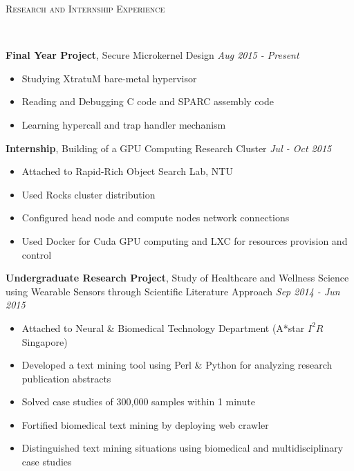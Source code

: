 \documentclass[a4paper, 12pt]{article}
\newenvironment{changemargin}[2]{%
  \begin{list}{}{%
      \setlength{\topsep}{0pt}%
      \setlength{\leftmargin}{#1}%
      \setlength{\rightmargin}{#2}%
      \setlength{\listparindent}{\parindent}%
      \setlength{\itemindent}{\parindent}%
      \setlength{\parsep}{\parskip}%
    }%
  \item[]}{\end{list}
}
\newcommand{\lineover}{
  \begin{changemargin}{-0.05in}{-0.05in}
    \vspace*{-8pt}
    \hrulefill \\
    \vspace*{-2pt}
  \end{changemargin}
}
\newcommand{\header}[1]{
  \begin{changemargin}{-0.6in}{-0.6in}
    \fontsize{15}{15}\scshape{#1}\\
    \lineover
    \vspace*{-4pt}
  \end{changemargin}
}
\newenvironment{body}
{
\vspace*{-16pt}
\begin{changemargin}{-0.25in}{-0.5in}
}
{
\end{changemargin}
}
\begin{document}
\smallskip
\header{Research and Internship Experience}
\begin{body}
  \vspace{14pt}
  \textbf{Final Year Project}, {Secure Microkernel Design} \hfill \emph{Aug 2015 - Present}\\
  \vspace*{-6pt}
  \begin{itemize} \itemsep -0pt  \small
  \item Studying XtratuM bare-metal hypervisor
  \item Reading and Debugging C code and SPARC assembly code
  \item Learning hypercall and trap handler mechanism
  \end{itemize}

  \textbf{Internship}, {Building of a GPU Computing Research Cluster} \hfill \emph{Jul - Oct 2015}\\
  \vspace*{-6pt}
  \begin{itemize} \itemsep -0pt  \small
  \item Attached to Rapid-Rich Object Search Lab, NTU
  \item Used Rocks cluster distribution
  \item Configured head node and compute nodes network connections
  \item Used Docker for Cuda GPU computing and LXC for resources provision and control
  \end{itemize}

  \textbf{Undergraduate Research Project}, {Study of Healthcare and Wellness Science using Wearable Sensors through Scientific Literature Approach} \hfill \emph{Sep 2014 - Jun 2015}\\
  \vspace*{-6pt}
  \begin{itemize} \itemsep -0pt  \small
  \item Attached to Neural \& Biomedical Technology Department (A*star $I^{2}R$ Singapore)
  \item Developed a text mining tool using Perl \& Python for analyzing research publication abstracts
  \item Solved case studies of 300,000 samples within 1 minute
  \item Fortified biomedical text mining by deploying web crawler
  \item Distinguished text mining situations using biomedical and multidisciplinary case studies
  \end{itemize}


\end{body}
\end{document}
